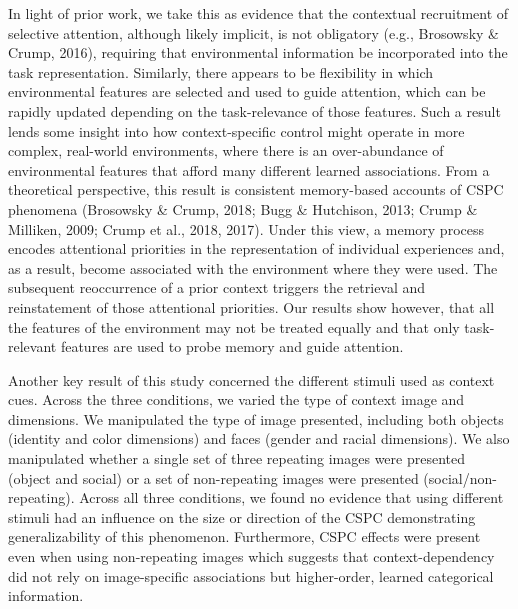 \documentclass[english,,man,floatsintext]{apa6}
\begin{document}
In light of prior work, we take this as evidence that the contextual
recruitment of selective attention, although likely implicit, is not
obligatory (e.g., Brosowsky \& Crump, 2016), requiring that
environmental information be incorporated into the task representation.
Similarly, there appears to be flexibility in which environmental
features are selected and used to guide attention, which can be rapidly
updated depending on the task-relevance of those features. Such a result
lends some insight into how context-specific control might operate in
more complex, real-world environments, where there is an over-abundance
of environmental features that afford many different learned
associations. From a theoretical perspective, this result is consistent
memory-based accounts of CSPC phenomena (Brosowsky \& Crump, 2018; Bugg
\& Hutchison, 2013; Crump \& Milliken, 2009; Crump et al., 2018, 2017).
Under this view, a memory process encodes attentional priorities in the
representation of individual experiences and, as a result, become
associated with the environment where they were used. The subsequent
reoccurrence of a prior context triggers the retrieval and reinstatement
of those attentional priorities. Our results show however, that all the
features of the environment may not be treated equally and that only
task-relevant features are used to probe memory and guide attention.

Another key result of this study concerned the different stimuli used as
context cues. Across the three conditions, we varied the type of context
image and dimensions. We manipulated the type of image presented,
including both objects (identity and color dimensions) and faces (gender
and racial dimensions). We also manipulated whether a single set of
three repeating images were presented (object and social) or a set of
non-repeating images were presented (social/non-repeating). Across all
three conditions, we found no evidence that using different stimuli had
an influence on the size or direction of the CSPC demonstrating
generalizability of this phenomenon. Furthermore, CSPC effects were
present even when using non-repeating images which suggests that
context-dependency did not rely on image-specific associations but
higher-order, learned categorical information.
\end{document}
